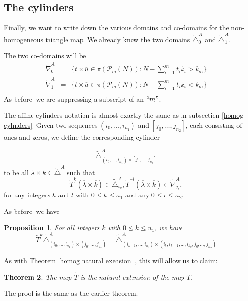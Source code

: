 \documentclass[12pt,oneside,openany]{article}
\newtheorem{theorem}{Theorem}[section]
\newtheorem{prop}[theorem]{Proposition}
\begin{document}
\subsection{The cylinders}


Finally, we want to write down the various domains and co-domains for the non-homogeneous triangle map.  We already know the two domains $ \tilde{\triangle}_0^A $ and $\tilde{\triangle}_1^A $.

The two co-domains will be 
\begin{eqnarray*}
 \tilde{\nabla}_0^A &=& \{\overline{ t } \times \overline{u}   \in \pi(\mathcal{P}_m(N)) : N- \sum_{i-1}^m t_i  k_i  > k_m \} \\
     \tilde{\nabla}_1^A &=& \{\overline{   t    } \times \overline{u}\in  \pi(\mathcal{P}_m(N))  :   N- \sum_{i-1}^m t_i  k_i  <k_m \} \\
\end{eqnarray*}
As before,  we are suppressing a subscript of an $``m"$.

The affine cylinders notation is almost exactly the same as  in subsection \ref{homog cylinders}.
Given two sequences $(i_0, \ldots, i_{n_1})$ and $[j_0, \ldots, j_{n_2}]$, each consisting of ones and zeros, we define the corresponding  cylinder 


$$\tilde{\triangle}_{ (i_0, \ldots, i_{n_1})\times [j_0, \ldots, j_{n_2}]   }^A  $$
to be all $\overline{\lambda} \times \overline{k} \in \tilde{\triangle}^A$ such that 
$$   \tilde{T}^k(\overline{\lambda} \times \overline{k}) \in \tilde{\triangle}_{i_k}^A,   \tilde{T}^{-l}(\overline{\lambda} \times \overline{k}) \in \tilde{\nabla}_{j_l}^A,$$
for any  integers $k$ and $l$ with $0\leq k \leq n_1$ and any $0\leq l \leq n_2.$

As before, we have 

\begin{prop} For all integers  $k$ with $0\leq k \leq n_1$, we have 
$$\tilde{T}^{k}\tilde{\triangle}_{  (i_0, \ldots, i_{n_1})\times (j_0, \ldots, j_{n_2})   }^A =   \tilde{\triangle}_{ (i_{k+1},  \ldots, i_{n_1}) \times  (i_k, i_{k-1}, \ldots, i_{k_0}, j_0, \ldots, j_{n_2} ) }^A  $$
\end{prop}

As with Theorem \ref{homog natural exension} , this will allow us to claim:
\begin{theorem}   The map $\tilde{T}$ is the natural extension of the map $T$.



\end{theorem}
The proof is the same as the earlier theorem.
\end{document}
